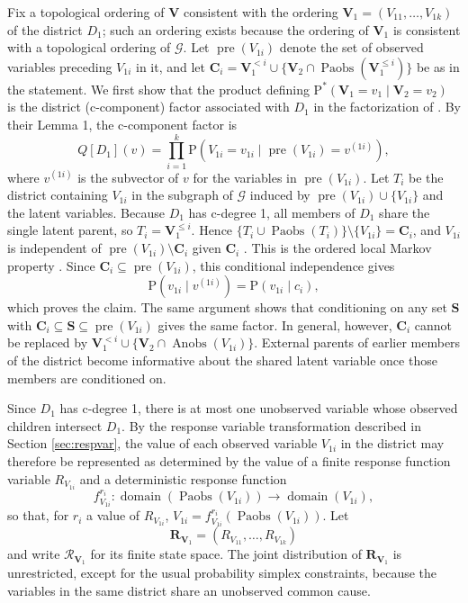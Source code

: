 \documentclass[12pt]{article}
\def\Pr{{\mathrm{P}}}
\def\Pdo{{\mathrm{P}^*}}
\DeclareMathOperator{\Anobs}{Anobs}
\DeclareMathOperator{\Paobs}{Paobs}
\newcommand{\bV}{\boldsymbol{V}}
\newcommand{\bR}{\boldsymbol{R}}
\begin{document}
Fix a topological ordering of $\bV$ consistent with the ordering $\bV_1 = (V_{11},\ldots,V_{1k})$ of the district $D_1$; such an ordering exists because the ordering of $\bV_1$ is consistent with a topological ordering of $\mathcal{G}$. Let $\operatorname{pre}(V_{1i})$ denote the set of observed variables preceding $V_{1i}$ in it, and let $\boldsymbol{C}_i = \bV_1^{<i} \cup \{\bV_2 \cap \Paobs(\bV_1^{\leq i})\}$ be as in the statement. We first show that the product defining $\Pdo(\bV_1=v_1\mid \bV_2=v_2)$ is the district (c-component) factor associated with $D_1$ in the factorization of \citet{tian2002identification}. By their Lemma 1, the c-component factor is
\[
Q[D_1](v) = \prod_{i=1}^k \Pr\!\left(V_{1i} = v_{1i} \mid \operatorname{pre}(V_{1i}) = v^{(1i)}\right),
\]
where $v^{(1i)}$ is the subvector of $v$ for the variables in $\operatorname{pre}(V_{1i})$. Let $T_i$ be the district containing $V_{1i}$ in the subgraph of $\mathcal{G}$ induced by $\operatorname{pre}(V_{1i}) \cup \{V_{1i}\}$ and the latent variables. Because $D_1$ has c-degree 1, all members of $D_1$ share the single latent parent, so $T_i = \bV_1^{\leq i}$. Hence $\{T_i \cup \Paobs(T_i)\} \setminus \{V_{1i}\} = \boldsymbol{C}_i$, and $V_{1i}$ is independent of $\operatorname{pre}(V_{1i}) \setminus \boldsymbol{C}_i$ given $\boldsymbol{C}_i$ \citep{tian2002testable}. This is the ordered local Markov property \citep{richardson2003admgs}. Since $\boldsymbol{C}_i \subseteq \operatorname{pre}(V_{1i})$, this conditional independence gives
\[
\Pr(v_{1i} \mid v^{(1i)}) = \Pr(v_{1i} \mid c_i),
\]
which proves the claim. The same argument shows that conditioning on any set $\boldsymbol{S}$ with $\boldsymbol{C}_i \subseteq \boldsymbol{S} \subseteq \operatorname{pre}(V_{1i})$ gives the same factor. In general, however, $\boldsymbol{C}_i$ cannot be replaced by $\bV_1^{<i} \cup \{\bV_2 \cap \Anobs(V_{1i})\}$. External parents of earlier members of the district become informative about the shared latent variable once those members are conditioned on.

Since $D_1$ has c-degree 1, there is at most one unobserved variable whose observed children intersect $D_1$.  By the response variable transformation described in Section \ref{sec:respvar}, the value of each observed variable $V_{1i}$ in the district may therefore be represented as determined by the value of a finite response function variable $R_{V_{1i}}$ and a deterministic response function
\[
    f^{r_i}_{V_{1i}}: \operatorname{domain}(\Paobs(V_{1i})) \rightarrow \operatorname{domain}(V_{1i}),
\]
so that, for $r_i$ a value of $R_{V_{1i}}$, $V_{1i} = f^{r_i}_{V_{1i}}(\Paobs(V_{1i})).$ Let
\[
    \bR_{\bV_1}
    =
    (R_{V_{11}},\ldots,R_{V_{1k}})
\]
and write $\mathcal{R}_{\bV_1}$ for its finite state space.  The
joint distribution of $\bR_{\bV_1}$ is unrestricted, except for the
usual probability simplex constraints, because the variables in the
same district share an unobserved common cause.
\end{document}
